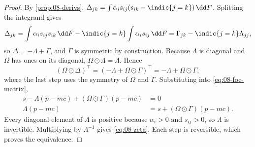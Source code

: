 \begin{proof}
By \cref{prop:08-derivs}, $\Delta_{jk} = \int \alpha_i s_{ij}(s_{ik} - \indic\{j=k\})\,\dd F$. Splitting the
integrand gives
\begin{equation*}
  \Delta_{jk} = \int \alpha_i s_{ij}s_{ik}\,\dd F - \indic\{j = k\}\int \alpha_i s_{ij}\,\dd F
  = \Gamma_{jk} - \indic\{j = k\}\Lambda_{jj},
\end{equation*}
so $\Delta = -\Lambda + \Gamma$, and $\Gamma$ is symmetric by construction. Because $\Lambda$ is diagonal and
$\Omega$ has ones on its diagonal, $\Omega \odot \Lambda = \Lambda$. Hence
\begin{equation*}
  (\Omega \odot \Delta)^\top = (-\Lambda + \Omega \odot \Gamma)^\top = -\Lambda + \Omega \odot \Gamma,
\end{equation*}
where the last step uses the symmetry of $\Omega$ and $\Gamma$. Substituting into \eqref{eq:08-foc-matrix},
\begin{align*}
  s - \Lambda(p - mc) + (\Omega \odot \Gamma)(p - mc) &= 0 \\
  \Lambda(p - mc) &= s + (\Omega \odot \Gamma)(p - mc).
\end{align*}
Every diagonal element of $\Lambda$ is positive because $\alpha_i > 0$ and $s_{ij} > 0$, so $\Lambda$ is invertible.
Multiplying by $\Lambda^{-1}$ gives \eqref{eq:08-zeta}. Each step is reversible, which proves the equivalence.
\end{proof}

